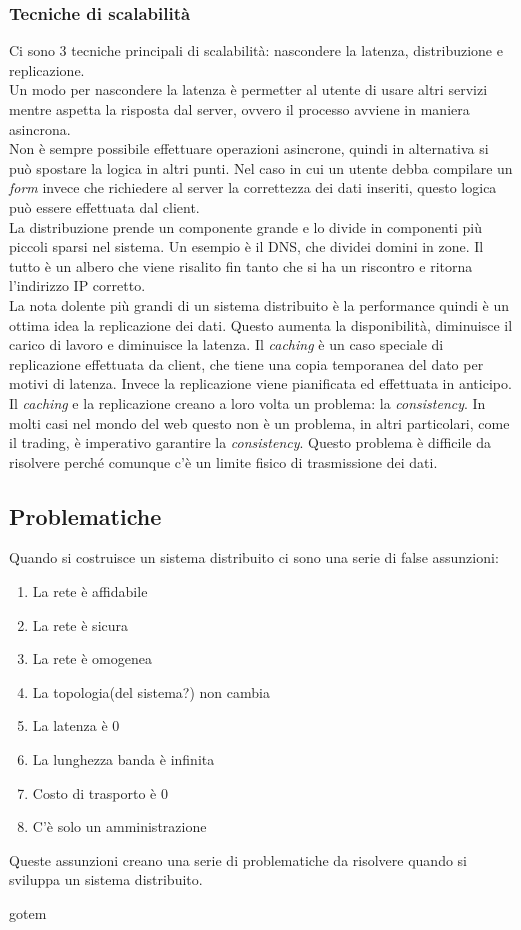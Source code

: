 \documentclass[12pt]{article}
\begin{document}
\subsubsection{Tecniche di scalabilità} 
Ci sono 3 tecniche principali di scalabilità: nascondere la latenza, distribuzione e replicazione.
\\ 
Un modo per nascondere la latenza è permetter al utente di usare altri servizi mentre aspetta la risposta dal server, ovvero il processo avviene in maniera asincrona.
\\ 
Non è sempre possibile effettuare operazioni asincrone, quindi in alternativa si può spostare la logica in altri punti. Nel caso in cui un utente debba compilare un \emph{form} invece che richiedere al server la correttezza dei dati inseriti, questo logica può essere effettuata dal client.
\\ 
La distribuzione prende un componente grande e lo divide in componenti più piccoli sparsi nel sistema. Un esempio è il DNS, che dividei domini in zone. Il tutto è un albero che viene risalito fin tanto che si ha un riscontro e ritorna l'indirizzo IP corretto.
\\ 
La nota dolente più grandi di un sistema distribuito è la performance quindi è un ottima idea la replicazione dei dati. Questo aumenta la disponibilità, diminuisce il carico di lavoro e diminuisce la latenza. Il \emph{caching} è un caso speciale di replicazione effettuata da client, che tiene una copia temporanea del dato per motivi di latenza. Invece la replicazione viene pianificata ed effettuata in anticipo. 
\\ Il \emph{caching} e la replicazione creano a loro volta un problema: la \emph{consistency}. In molti casi nel mondo del web questo non è un problema, in altri particolari, come il trading, è imperativo garantire la \emph{consistency}. Questo problema è difficile da risolvere perché comunque c'è un limite fisico di trasmissione dei dati.

\subsection{Problematiche}
Quando si costruisce un sistema distribuito ci sono una serie di false assunzioni: 

\begin{enumerate}
    \item La rete è affidabile
    \item La rete è sicura
    \item La rete è omogenea
    \item La topologia(del sistema?) non cambia
    \item La latenza è 0
    \item La lunghezza banda è infinita
    \item Costo di trasporto è 0
    \item C'è solo un amministrazione
\end{enumerate}
Queste assunzioni creano una serie di problematiche da risolvere quando si sviluppa un sistema distribuito. 

\newpage
gotem
\end{document}
